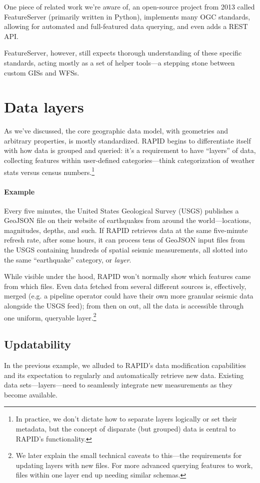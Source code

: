 One piece of related work we're aware of, an open-source project from 2013 called FeatureServer (primarily written in Python), implements many OGC standards, allowing for automated and full-featured data querying, and even adds a REST API.

FeatureServer, however, still expects thorough understanding of these specific standards, acting mostly as a set of helper tools---a stepping stone between custom GISs and WFSs.


\section{Data layers}
\label{reqs_layers}
As we've discussed, the core geographic data model, with geometries and arbitrary properties, is mostly standardized. RAPID begins to differentiate itself with how data is grouped and queried: it's a requirement to have ``layers'' of data, collecting features within user-defined categories---think categorization of weather stats versus census numbers.\footnote{In practice, we don't dictate how to separate layers logically or set their metadata, but the concept of disparate (but grouped) data is central to RAPID's functionality.}

\paragraph{Example}
Every five minutes, the United States Geological Survey (USGS) publishes a GeoJSON file on their website of earthquakes from around the world---locations, magnitudes, depths, and such. If RAPID retrieves data at the same five-minute refresh rate, after some hours, it can process tens of GeoJSON input files from the USGS containing hundreds of spatial seismic measurements, all slotted into the same ``earthquake'' category, or \textit{layer}.

While visible under the hood, RAPID won't normally show which features came from which files. Even data fetched from several different sources is, effectively, merged (e.g. a pipeline operator could have their own more granular seismic data alongside the USGS feed); from then on out, all the data is accessible through one uniform, queryable layer.\footnote{We later explain the small technical caveats to this---the requirements for updating layers with new files. For more advanced querying features to work, files within one layer end up needing similar schemas.}

\subsection{Updatability}
In the previous example, we alluded to RAPID's data modification capabilities and its expectation to regularly and automatically retrieve new data. Existing data sets---layers---need to seamlessly integrate new measurements as they become available.


